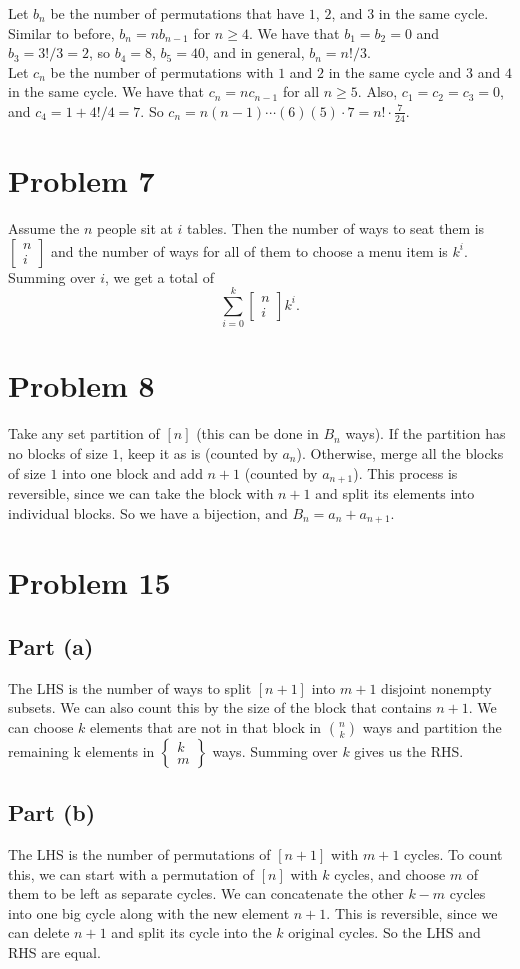 \documentclass{article}
\newcommand{\fstirling}[2]
    {\left[
    \begin{matrix}
        #1 \\
        #2
    \end{matrix}
    \right]}
\newcommand{\sstirling}[2]
    {\left\{
    \begin{matrix}
        #1 \\
        #2
    \end{matrix}
    \right\}}
\begin{document}
Let $b_n$ be the number of permutations that have $1$, $2$, and $3$ in the same cycle. Similar to before, $b_n = nb_{n-1}$ for $n \ge 4$. We have that $b_1 = b_2 = 0$ and $b_3 = 3!/3 = 2$, so $b_4 = 8$, $b_5 = 40$, and in general, $b_n = n!/3$. \\

Let $c_n$ be the number of permutations with $1$ and $2$ in the same cycle and $3$ and $4$ in the same cycle. We have that $c_n = nc_{n - 1}$ for all $n \ge 5$. Also, $c_1 = c_2 = c_3 = 0$, and $c_4 = 1 + 4!/4 = 7$. So $c_n = n(n - 1)\cdots(6)(5) \cdot 7 = n! \cdot \frac{7}{24}$.

\section*{Problem 7}
Assume the $n$ people sit at $i$ tables. Then the number of ways to seat them is $\fstirling ni$ and the number of ways for all of them to choose a menu item is $k^i$. Summing over $i$, we get a total of
$$\sum_{i = 0}^k \fstirling ni k^i.$$

\section*{Problem 8}
Take any set partition of $[n]$ (this can be done in $B_n$ ways). If the partition has no blocks of size $1$, keep it as is (counted by $a_n$). Otherwise, merge all the blocks of size $1$ into one block and add $n + 1$ (counted by $a_{n + 1}$). This process is reversible, since we can take the block with $n + 1$ and split its elements into individual blocks. So we have a bijection, and $B_n = a_n + a_{n + 1}$.

\section*{Problem 15}
\subsection*{Part (a)}
The LHS is the number of ways to split $[n + 1]$ into $m + 1$ disjoint nonempty subsets. We can also count this by the size of the block that contains $n + 1$. We can choose $k$ elements that are not in that block in $\binom nk$ ways and partition the remaining k elements in $\sstirling km$ ways. Summing over $k$ gives us the RHS.

\subsection*{Part (b)}
The LHS is the number of permutations of $[n + 1]$ with $m + 1$ cycles. To count this, we can start with a permutation of $[n]$ with $k$ cycles, and choose $m$ of them to be left as separate cycles. We can concatenate the other $k - m$ cycles into one big cycle along with the new element $n + 1$. This is reversible, since we can delete $n + 1$ and split its cycle into the $k$ original cycles. So the LHS and RHS are equal.
\end{document}
